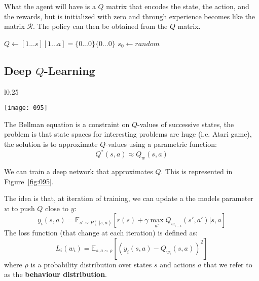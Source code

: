 What the agent will have is a \(Q\) matrix that encodes the state, the action, and the rewards, but is initialized with zero and through experience becomes like the matrix \(\mathcal{R}\). The policy can then be obtained from the \(Q\) matrix.

\begin{algorithm}
    \caption{\(Q\)-Learning}
    \label{alg:q_learning}
    $Q \gets [1...s][1...a] = \{0...0\}\{0...0\}$\;
    $s_0 \gets random$\;
     {
    }
\end{algorithm}

\subsection{Deep \(Q\)-Learning}
\begin{wrapfigure}{l}{0.25\textwidth}
    \begin{center}
        \texttt{[image: 095]}
        \caption{}
    \end{center}
    \label{fig:095}
\end{wrapfigure}
The Bellman equation is a constraint on \(Q\)-values of successive states, the problem is that state spaces for interesting problems are huge (i.e. Atari game), the solution is to approximate \(Q\)-values using a parametric function:
\begin{equation}
    Q^*(s,a) \approx Q_w(s,a)
\end{equation}

We can train a deep network that approximates \(Q\). This is represented in Figure~\ref{fig:095}.

The idea is that, at iteration of training, we can update a the models parameter \(w\) to push \(Q\) close to \(y\):
\begin{equation}
    y_i(s,a) = \mathbb{E}_{s' \sim P( \cdot | s,a)} \left[
        r(s) + \gamma \max_{a'} Q_{w_{i-i}}(s',a') | s,a
    \right]
\end{equation}
The loss function (that change at each iteration) is defined as:
\begin{equation}
    L_i (w_i) = \mathbb{E}_{s, a \sim \rho} \left[
        (y_i(s,a) - Q_{w_i} (s,a))^2
    \right]
\end{equation}
where \(\rho\) is a probability distribution over states \(s\) and actions \(a\) that we refer to as the \textbf{behaviour distribution}.

